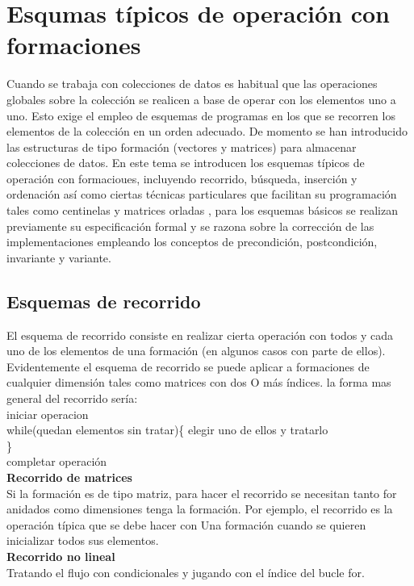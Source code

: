 \documentclass[11pt,a4paper]{article}
\begin{document}
  	\section{Esqumas típicos de operación con formaciones}
  	Cuando se trabaja con colecciones de datos es habitual que las operaciones
  	globales sobre la colección se realicen a base de operar con los elementos uno
  	a uno. Esto exige el empleo de esquemas de programas en los que se recorren
  	los elementos de la colección en un orden adecuado.
  	De momento se han introducido las estructuras de tipo formación (vectores
  	y matrices) para almacenar colecciones de datos. En este tema se introducen
  	los esquemas típicos de operación con formacioues, incluyendo recorrido,
  	búsqueda, inserción y ordenación así como ciertas técnicas particulares que
  	facilitan su programación tales como centinelas y matrices orladas ,
  	para los esquemas básicos se realizan previamente su especificación formal y
  	se razona sobre la corrección de las implementaciones empleando los conceptos
  	de precondición, postcondición, invariante y variante.
  	\subsection{Esquemas de recorrido}
  	El esquema de recorrido consiste en realizar cierta operación con todos y cada uno de los elementos de una formación (en algunos casos con parte de ellos).
  	Evidentemente el esquema de recorrido se puede aplicar a formaciones de
  	cualquier dimensión tales como matrices con dos O más índices. la forma mas general del recorrido sería:\\
  	iniciar operacion\\
  	while(quedan elementos sin tratar)\{
  	elegir uno de ellos y tratarlo\\
  	\}\\
  	completar operación\\
  	\textbf{Recorrido de matrices}\\
  	Si la formación es de tipo matriz, para hacer el recorrido se necesitan tanto for anidados como dimensiones tenga la formación. Por ejemplo, el recorrido es la operación típica que se debe hacer con Una formación cuando se quieren inicializar todos sus elementos.\\
  	\textbf{Recorrido no lineal}\\
  	Tratando el flujo con condicionales y jugando con el índice del bucle for.
\end{document}
